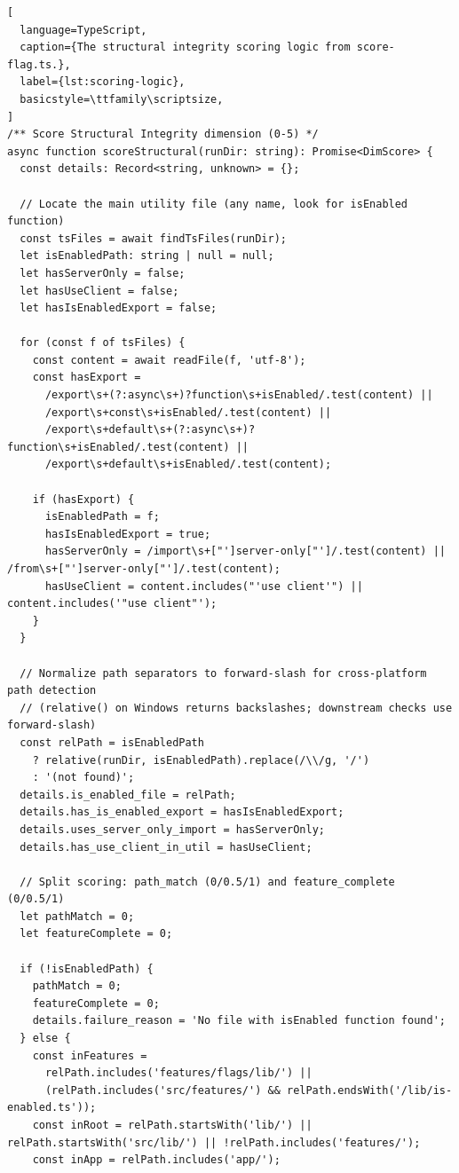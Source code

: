 \documentclass[12pt,a4paper]{report}
\begin{document}
\begin{lstlisting}[
  language=TypeScript,
  caption={The structural integrity scoring logic from score-flag.ts.},
  label={lst:scoring-logic},
  basicstyle=\ttfamily\scriptsize,
]
/** Score Structural Integrity dimension (0-5) */
async function scoreStructural(runDir: string): Promise<DimScore> {
  const details: Record<string, unknown> = {};

  // Locate the main utility file (any name, look for isEnabled function)
  const tsFiles = await findTsFiles(runDir);
  let isEnabledPath: string | null = null;
  let hasServerOnly = false;
  let hasUseClient = false;
  let hasIsEnabledExport = false;

  for (const f of tsFiles) {
    const content = await readFile(f, 'utf-8');
    const hasExport =
      /export\s+(?:async\s+)?function\s+isEnabled/.test(content) ||
      /export\s+const\s+isEnabled/.test(content) ||
      /export\s+default\s+(?:async\s+)?function\s+isEnabled/.test(content) ||
      /export\s+default\s+isEnabled/.test(content);

    if (hasExport) {
      isEnabledPath = f;
      hasIsEnabledExport = true;
      hasServerOnly = /import\s+["']server-only["']/.test(content) || /from\s+["']server-only["']/.test(content);
      hasUseClient = content.includes("'use client'") || content.includes('"use client"');
    }
  }

  // Normalize path separators to forward-slash for cross-platform path detection
  // (relative() on Windows returns backslashes; downstream checks use forward-slash)
  const relPath = isEnabledPath
    ? relative(runDir, isEnabledPath).replace(/\\/g, '/')
    : '(not found)';
  details.is_enabled_file = relPath;
  details.has_is_enabled_export = hasIsEnabledExport;
  details.uses_server_only_import = hasServerOnly;
  details.has_use_client_in_util = hasUseClient;

  // Split scoring: path_match (0/0.5/1) and feature_complete (0/0.5/1)
  let pathMatch = 0;
  let featureComplete = 0;

  if (!isEnabledPath) {
    pathMatch = 0;
    featureComplete = 0;
    details.failure_reason = 'No file with isEnabled function found';
  } else {
    const inFeatures =
      relPath.includes('features/flags/lib/') ||
      (relPath.includes('src/features/') && relPath.endsWith('/lib/is-enabled.ts'));
    const inRoot = relPath.startsWith('lib/') || relPath.startsWith('src/lib/') || !relPath.includes('features/');
    const inApp = relPath.includes('app/');


\end{lstlisting}
\end{document}
